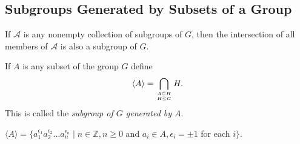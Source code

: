 \documentclass[../main]{subfiles}
\begin{document}
 
 \subsection{Subgroups Generated by Subsets of a Group}
 
 
 \begin{prop}
  If $\mathcal{A}$ is any nonempty collection of subgroups of $G$, then the intersection of all members of $\mathcal{A}$ is also a subgroup of $G$.
 \end{prop}

 
 \begin{dfn}
  If $A$ is any subset of the group $G$ define
  \begin{align*}
   \langle A \rangle = \bigcap\limits_{A \subseteq H \atop H\leq G} H.
  \end{align*}
  This is called the \textit{subgroup of $G$ generated by $A$}.
 \end{dfn}
 
 
 \begin{nt}
  $\langle A \rangle = \{a_1^{\epsilon_1} a_2^{\epsilon_2}\ldots a_n^{\epsilon_n} \mid n\in \mathbb{Z}, n\geq 0$ and $a_i\in A, \epsilon_i = \pm 1$ for each $i\}$.
 \end{nt}
\end{document}
